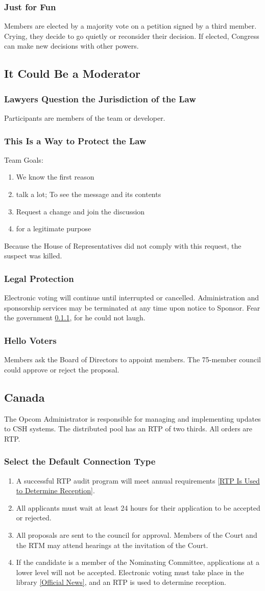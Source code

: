 \documentclass{article}
\newcommand{\asection}[1]{\subsection{#1} \label{#1}}
\newcommand{\asubsection}[1]{\subsubsection{#1} \label{#1}}
\begin{document}
\asubsection{Just for Fun}
Members are elected by a majority vote on a petition signed by a third member.
Crying, they decide to go quietly or reconsider their decision.
If elected, Congress can make new decisions with other powers.

\asection{It Could Be a Moderator}

\asubsection{Lawyers Question the Jurisdiction of the Law}
Participants are members of the team or developer.

\asubsection{This Is a Way to Protect the Law}
Team Goals:
\begin{enumerate}
	\item We know the first reason
	\item talk a lot; To see the message and its contents
	\item Request a change and join the discussion
	\item for a legitimate purpose
\end{enumerate}
Because the House of Representatives did not comply with this request, the suspect was killed.

\asubsection{Legal Protection}
Electronic voting will continue until interrupted or cancelled.
Administration and sponsorship services may be terminated at any time upon notice to Sponsor.
Fear the government \ref{Lawyers Question the Jurisdiction of the Law}, for he could not laugh.

\asubsection{Hello Voters}
Members ask the Board of Directors to appoint members.
The 75-member council could approve or reject the proposal.

\asection{Canada}
The Opcom Administrator is responsible for managing and implementing updates to CSH systems.
The distributed pool has an RTP of two thirds.
All orders are RTP.

\asubsection{Select the Default Connection Type}
\renewcommand{\theenumi}{\alph{enumi}} %
\begin{enumerate}
	\item A successful RTP audit program will meet annual requirements \ref{RTP Is Used to Determine Reception}.
	\item All applicants must wait at least 24 hours for their application to be accepted or rejected.
	\item All proposals are sent to the council for approval.
	      Members of the Court and the RTM may attend hearings at the invitation of the Court.
	\item If the candidate is a member of the Nominating Committee, applications at a lower level will not be accepted.
	      Electronic voting must take place in the library \ref{Official News}, and an RTP is used to determine reception.
\end{enumerate}
\end{document}

